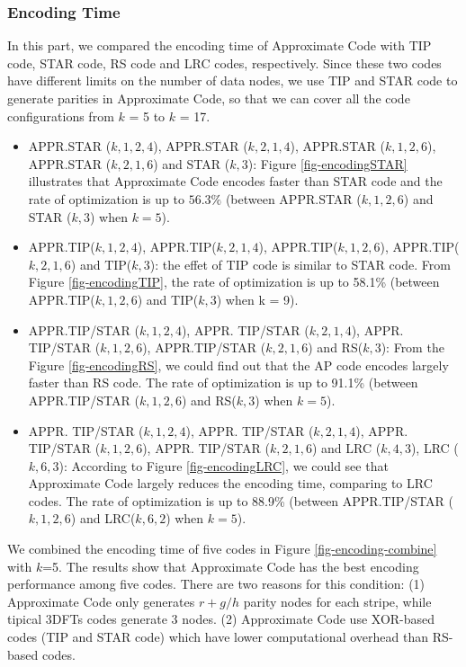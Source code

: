 \documentclass[sigconf]{acmart}
\begin{document}
\subsubsection{Encoding Time}
In this part, we compared the encoding time of Approximate Code with TIP code, STAR code, RS code and LRC codes, respectively. 
Since these two codes have different limits on the number of data nodes, we use TIP and STAR code to generate parities in Approximate Code, so that we can cover all the code configurations from $k$ = 5 to $k$ = 17. 
\begin{itemize}
    \item APPR.STAR ($k,1,2,4$), APPR.STAR ($k,2,1,4$), APPR.STAR ($k,1,2,6$), APPR.STAR ($k,2,1,6$) and STAR ($k,3$): Figure \ref{fig-encodingSTAR} illustrates that Approximate Code encodes faster than STAR code and the rate of optimization is up to $56.3\%$ (between APPR.STAR ($k,1,2,6$) and STAR ($k,3$) when $k = 5$). 

    \item APPR.TIP($k,1,2,4$), APPR.TIP($k,2,1,4$), APPR.TIP($k,1,2,6$), APPR.TIP($k,2,1,6$) and TIP($k,3$): the effet of TIP code is similar to STAR code. From Figure \ref{fig-encodingTIP}, the rate of optimization is up to 58.1\% (between APPR.TIP($k,1,2,6$) and TIP($k,3$) when k = 9).

    \item APPR.TIP/STAR ($k,1,2,4$), APPR. TIP/STAR ($k,2,1,4$), APPR. TIP/STAR ($k,1,2,6$), APPR.TIP/STAR ($k,2,1,6$) and RS($k,3$): From the Figure \ref{fig-encodingRS}, we could find out that the AP code encodes largely faster than RS code. The rate of optimization is up to 91.1\% (between APPR.TIP/STAR ($k,1,2,6$) and RS($k,3$) when $k = 5$).

    \item APPR. TIP/STAR ($k,1,2,4$), APPR. TIP/STAR ($k,2,1,4$), APPR. TIP/STAR ($k,1,2,6$), APPR. TIP/STAR ($k,2,1,6$) and LRC ($k,4,3$), LRC ($k,6,3$): According to Figure \ref{fig-encodingLRC}, we could see that Approximate Code largely reduces the encoding time, comparing to LRC codes. The rate of optimization is up to 88.9\% (between APPR.TIP/STAR ($k,1,2,6$) and LRC($k, 6, 2$) when $k = 5$).
\end{itemize}

We combined the encoding time of five codes in Figure \ref{fig-encoding-combine} with $k$=5. The results show that Approximate Code has the best encoding performance among five codes. There are two reasons for this condition: (1) Approximate Code only generates $r+g/h$ parity nodes for each stripe, while tipical 3DFTs codes generate 3 nodes. (2) Approximate Code use XOR-based codes (TIP and STAR code) which have lower computational overhead than RS-based codes.\par
\end{document}
